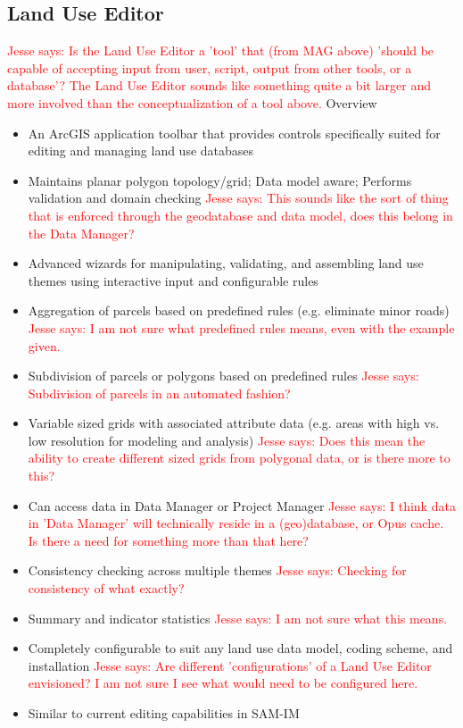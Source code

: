 \documentclass[titlepage]{article}
\begin{document}
\subsection{Land Use Editor}
\textcolor{red}{Jesse says: Is the Land Use Editor a 'tool' that (from MAG above) 'should be capable of accepting input from user, script, output from other tools, or a database'?  The Land Use Editor sounds like something quite a bit larger and more involved than the conceptualization of a tool above.}
Overview
\begin{itemize}
	\item An ArcGIS application toolbar that provides controls specifically suited for editing and managing land use databases
	\item Maintains planar polygon topology/grid; Data model aware; Performs validation and domain checking
		\textcolor{red}{Jesse says: This sounds like the sort of thing that is enforced through the geodatabase and data model, does this belong in the Data Manager?}
	\item Advanced wizards for manipulating, validating, and assembling land use themes using interactive input and configurable rules
	\item Aggregation of parcels based on predefined rules (e.g. eliminate minor roads)
		\textcolor{red}{Jesse says: I am not sure what predefined rules means, even with the example given.}
	\item Subdivision of parcels or polygons based on predefined rules
		\textcolor{red}{Jesse says: Subdivision of parcels in an automated fashion?}
	\item Variable sized grids with associated attribute data (e.g. areas with high vs. low resolution for modeling and analysis)
		\textcolor{red}{Jesse says: Does this mean the ability to create different sized grids from polygonal data, or is there more to this?}
	\item Can access data in Data Manager or Project Manager
		\textcolor{red}{Jesse says: I think data in 'Data Manager' will technically reside in a (geo)database, or Opus cache.  Is there a need for something more than that here?}
	\item Consistency checking across multiple themes
		\textcolor{red}{Jesse says: Checking for consistency of what exactly?}
	\item Summary and indicator statistics
		\textcolor{red}{Jesse says: I am not sure what this means.}
	\item Completely configurable to suit any land use data model, coding scheme, and installation
		\textcolor{red}{Jesse says: Are different 'configurations' of a Land Use Editor envisioned?  I am not sure I see what would need to be configured here.}
	\item Similar to current editing capabilities in SAM-IM
\end{itemize}
\end{document}
